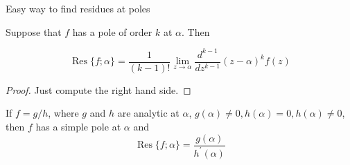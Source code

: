 \documentclass{beamer}
\DeclareMathOperator{\Res}{Res}
\begin{document}
\begin{frame}{Easy way to find residues at poles}
\begin{theorem}
Suppose that $f$ has a pole of order $k$ at $\alpha$.  Then

$$\Res\{f;\alpha\}=\frac{1}{(k-1)!}\lim_{z\to\alpha} \frac{d^{k-1}}{dz^{k-1}} (z-\alpha)^kf(z)$$
\end{theorem}
\begin{proof}Just compute the right hand side.
\end{proof}
\begin{corollary}
If $f=g/h$, where $g$ and $h$ are analytic at $\alpha$, $g(\alpha)\neq 0, h(\alpha)=0, h(\alpha)\neq 0$, then $f$ has a simple pole at $\alpha$ and
$$\Res\{f;\alpha\}=\frac{g(\alpha)}{h^\prime(\alpha)}$$
\end{corollary}
\end{frame}
\end{document}
